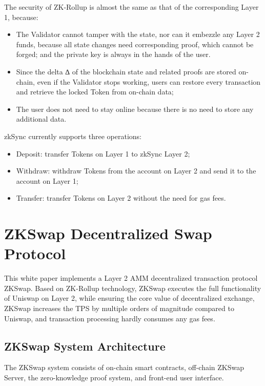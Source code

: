 \documentclass[]{template/llncs}
\begin{document}
The security of ZK-Rollup is almost the same as that of the corresponding Layer 1, because:


\begin{itemize}
	\item The Validator cannot tamper with the state, nor can it embezzle any Layer 2 funds, because all state changes need corresponding proof, which cannot be forged; and the private key is always in the hands of the user.
	\item Since the delta ∆ of the blockchain state and related proofs are stored on-chain, even if the Validator stops working, users can restore every transaction and retrieve the locked Token from on-chain data;
	\item The user does not need to stay online because there is no need to store any additional data.
\end{itemize}

zkSync currently supports three operations:

\begin{itemize}
	\item Deposit: transfer Tokens on Layer 1 to zkSync Layer 2;
	\item Withdraw: withdraw Tokens from the account on Layer 2 and send it to the account on Layer 1;
	\item Transfer: transfer Tokens on Layer 2 without the need for gas fees.
\end{itemize}

\section{ZKSwap Decentralized Swap Protocol}

This white paper implements a Layer 2 AMM decentralized transaction protocol ZKSwap. Based on ZK-Rollup technology, ZKSwap executes the full functionality of Uniswap on Layer 2, while ensuring the core value of decentralized exchange, ZKSwap increases the TPS by multiple orders of magnitude compared to Uniswap, and transaction processing hardly consumes any gas fees.

\subsection{ZKSwap System Architecture}

The ZKSwap system consists of on-chain smart contracts, off-chain ZKSwap Server, the zero-knowledge proof system, and front-end user interface.
\end{document}
